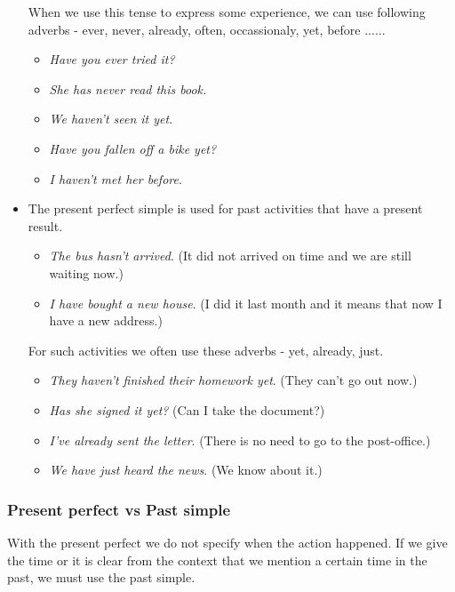 \begin{itemize}
When we use this tense to express some experience, we can use following adverbs - ever, never, already, often, occassionaly, yet, before ......

\begin{itemize}
\item \textit{Have you ever tried it?}
\item \textit{She has never read this book.}
\item \textit{We haven't seen it yet}.
\item \textit{Have you fallen off a bike yet?}
\item \textit{I haven't met her before}.
\end{itemize}

\item The present perfect simple is used for past activities that have a present result.

\begin{itemize}
\item \textit{The bus hasn't arrived}. (It did not arrived on time and we are still waiting now.) 
\item \textit{I have bought a new house}. (I did it last month and it means that now I have a new address.)
\end{itemize}

For such activities we often use these adverbs -  yet, already, just. 

\begin{itemize}
\item \textit{They haven't finished their homework yet}. (They can't go out now.) 
\item \textit{Has she signed it yet?} (Can I take the document?)
\item \textit{I've already sent the letter}. (There is no need to go to the post-office.) 
\item \textit{We have just heard the news}.  (We know about it.)
\end{itemize}

\end{itemize}

\subsubsection{Present perfect vs Past simple}

With the present perfect we do not specify when the action happened. If we give the time or it is clear from the context that we mention a certain time in the past, we must use the past simple. 

